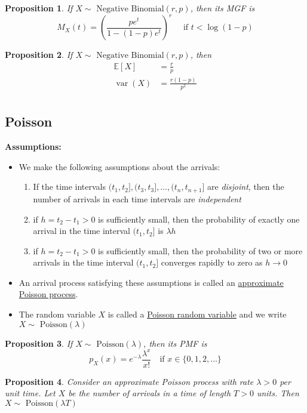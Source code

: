 \documentclass[
]{article}
\newtheorem{proposition}{Proposition}[section]
\theoremstyle{definition}
\theoremstyle{definition}
\theoremstyle{definition}
\theoremstyle{remark}
\newcommand{\pxx}{p_X(x)}
\newcommand{\mx}[1]{M_X(#1)}
\newcommand{\E}[1]{\mathbb{E}[#1]}
\newcommand{\varx}{\operatorname{var}(X)}
\newcommand{\nbin}[1]{\sim\text{ Negative Binomial}\left( #1 \right)}
\newcommand{\pssn}[1]{\sim\text{ Poisson}\left( #1 \right)}
\begin{document}
\begin{proposition}
  If $X\nbin{r,p}$, then its MGF is
  \[\mx{t}=\left(\frac{pe^t}{1-(1-p)e^t}\right)^r\quad\text{ if }t<\log(1-p)\]
\end{proposition}

\begin{proposition}
  If $X\nbin{r,p}$, then
  \begin{align*}
    \E{X} & =\frac{r}{p}        \\
    \varx & =\frac{r(1-p)}{p^2} \\
  \end{align*}
\end{proposition}

\subsection{Poisson}

\textbf{Assumptions:}
\begin{itemize}
  \item We make the following assumptions about the arrivals:
        \begin{enumerate}
          \item If the time intervals $(t_1,t_2],(t_3,t_3],\dots,(t_n,t_{n+1}]$ are \textit{disjoint}, then the number of arrivals in each time intervals are \textit{independent}
          \item if $h=t_2-t_1>0$ is sufficiently small, then the probability of exactly one arrival in the time interval $(t_1,t_2]$ is $\lambda h$
          \item if $h=t_2-t_1>0$ is sufficiently small, then the probability of two or more arrivals in the time interval $(t_1,t_2]$ converges rapidly to zero as $h\to0$
        \end{enumerate}
  \item An arrival process satisfying these assumptions is called an \underline{approximate} \underline{Poisson process}.
  \item The random variable $X$ is called a \underline{Poisson random variable} and we write $X\pssn{\lambda}$
\end{itemize}

\begin{proposition}
  If $X\pssn{\lambda}$, then its PMF is
  \[\pxx=e^{-\lambda}\frac{\lambda^x}{x!}\quad\text{if }x\in\{0,1,2,\dots\}\]
\end{proposition}

\begin{proposition}
  Consider an approximate Poisson process with rate $\lambda>0$ per unit time. Let $X$ be the number of arrivals in a time of length $T>0$ units. Then $X\pssn{\lambda T}$
\end{proposition}
\end{document}
